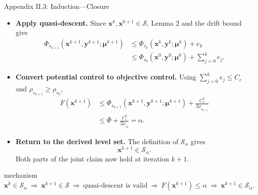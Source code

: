 \documentclass[handout,compress,9pt]{beamer}
\newcommand{\blue}[1]{\textcolor{ddlblue}{#1}}
\newcommand{\bx}{\bm{x}}
\newcommand{\by}{\bm{y}}
\newcommand{\bmu}{\bm{\mu}}
\newcommand{\calS}{\mathcal{S}}
\begin{document}
\begin{frame}{Appendix II.3: Induction---Closure
\hfill\hyperlink{appendix:contents}{}}
\scriptsize
\begin{itemize}
\setlength{\itemsep}{0.16cm}

\item[\blue{$\triangleright$}]
\textbf{Apply quasi-descent.}
Since $\bx^k,\bx^{k+1}\in\calS$, Lemma 2 and the drift bound give
\begin{equation*}
\begin{aligned}
  \Phi_{s_{k+1}}(\bx^{k+1},\by^{k+1};\bmu^{k+1})
  &\leq \Phi_{s_k}(\bx^k,\by^k;\bmu^k)+e_k\\
  &\leq \Phi_{s_0}(\bx^0,\by^0;\bmu^0)
  +\sum_{j=0}^{k}e_j.
\end{aligned}
\end{equation*}

\item[\blue{$\triangleright$}]
\textbf{Convert potential control to objective control.}
Using $\sum_{j=0}^{k}e_j\leq C_e$ and
$\rho_{s_{k+1}}\geq\rho_{s_0}$,
\begin{equation*}
\begin{aligned}
  F(\bx^{k+1})
  &\leq
  \Phi_{s_{k+1}}(\bx^{k+1},\by^{k+1};\bmu^{k+1})
  +\frac{C_r^2}{2\rho_{s_{k+1}}}\\
  &\leq
  \overline\Phi+\frac{C_r^2}{2\rho_{s_0}}
  =\alpha.
\end{aligned}
\end{equation*}

\item[\blue{$\triangleright$}]
\textbf{Return to the derived level set.}
The definition of $\calS_\alpha$ gives
\begin{equation*}
  \bx^{k+1}\in\calS_\alpha.
\end{equation*}
Both parts of the joint claim now hold at iteration $k+1$.
\end{itemize}

\begin{block}{mechanism}
\centering
$\displaystyle
\bx^k\in\calS_\alpha
\ \Longrightarrow\ 
\bx^{k+1}\in\calS
\ \Longrightarrow\ 
\text{quasi-descent is valid}
\ \Longrightarrow\ 
F(\bx^{k+1})\leq\alpha
\ \Longrightarrow\ 
\bx^{k+1}\in\calS_\alpha.$
\end{block}
\end{frame}
\end{document}
